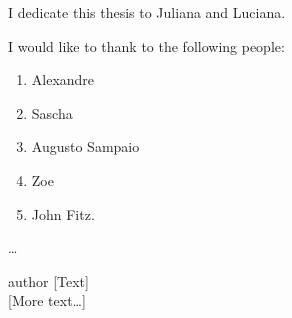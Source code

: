 \begin{dedicatory}
I dedicate this thesis to Juliana and Luciana.
\end{dedicatory}

\acknowledgements
I would like to thank to the following people:
\begin{enumerate}
  \item Alexandre
  \item Sascha
  \item Augusto Sampaio
  \item Zoe
  \item John Fitz.
\end{enumerate}
\ldots

\begin{epigraph}[title]{author}
[Text]\\
\vspace{0.5cm}
[More text\ldots]
\end{epigraph}